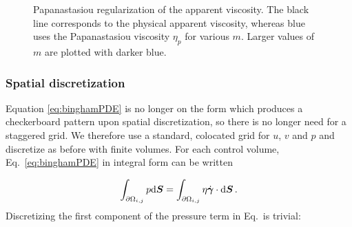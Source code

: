 \documentclass[final,3p,twocolumn]{elsarticle}
\begin{document}
\begin{figure}[htb]
    \centering
    \caption
    {
        Papanastasiou regularization of the apparent viscosity. The black line
        corresponds to the physical apparent viscosity, whereas blue uses the
        Papanastasiou viscosity $\eta_p$ for various $m$.  Larger values of $m$
        are plotted with darker blue. 
    }
    \label{fig:regularization}
\end{figure}

\subsubsection{Spatial discretization}

Equation \eqref{eq:binghamPDE} is no longer on the form which produces a
checkerboard pattern upon spatial discretization, so there is no longer need
for a staggered grid. We therefore use a standard, colocated grid for $u$, $v$
and $p$ and discretize as before with finite volumes. For each control volume,
Eq.\ \eqref{eq:binghamPDE} in integral form can be written

\begin{equation}
    \int_{\partial \Omega_{i,j}} p {\rm d}\bm{S} = \int_{\partial \Omega_{i,j}}
    \eta \dot{\bm{\gamma}} \cdot {\rm d}\bm{S} \,.
    \label{eq:binghamFVM}
\end{equation}
%
Discretizing the first component of the pressure term in Eq.\ is trivial: 
\end{document}
